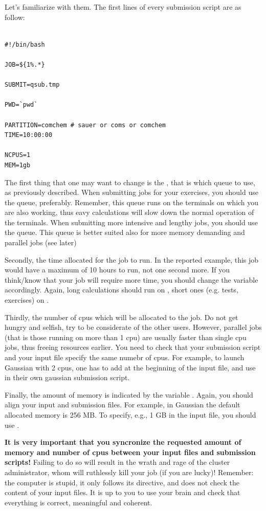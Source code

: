 \documentclass{article}
\begin{document}
Let's familiarize with them. The first lines of every submission script are as follow:

\begin{verbatim}

#!/bin/bash

JOB=${1%.*}

SUBMIT=qsub.tmp

PWD=`pwd`

PARTITION=comchem # sauer or coms or comchem
TIME=10:00:00

NCPUS=1
MEM=1gb

\end{verbatim}

The first thing that one may want to change is the , that is which queue to use, as previously described.
When submitting jobs for your exercises, you should use the  queue, preferably.
Remember, this queue runs on the terminals on which you are also working, thus eavy calculations will slow down the normal operation
of the terminals.
When submitting more intensive and lengthy jobs, you should use the  queue. This queue is better suited also for more memory demanding
and parallel jobs (see later)

Secondly, the time allocated for the job to run. In the reported example, this job would have a maximum of 10 hours to run, not one second more.
If you think/know that your job will require more time, you should change the variable  accordingly.
Again, long calculations should run on , short ones (e.g. tests, exercises) on .

Thirdly, the number of cpus which will be allocated to the job. Do not get hungry and selfish, try to be considerate of the other users.
However, parallel jobs (that is those running on more than 1 cpu) are usually faster than single cpu jobs, thus freeing resources earlier. You need to
check that your submission script and your input file specify the same numebr of cpus. For example, to launch Gaussian with 2 cpus, one has to add
 at the beginning of the input file, and use  in their own gaussian submission script.

Finally, the amount of memory is indicated by the variable . Again, you should align your input and submission files.
For example, in Gaussian the default allocated memory is 256 MB. To specify, e.g., 1 GB in the input file, you should use .

{\bf It is very important that you syncronize the requested amount of memory and number of cpus between your input files and submission scripts!}
Failing to do so will result in the wrath and rage of the cluster administrator, whom will ruthlessly kill your job (if you are lucky)!
Remember: the computer is stupid, it only follows its directive, and does not check the content of your input files.
It is up to you to use your brain and check that everything is correct, meaningful and coherent.
\end{document}
